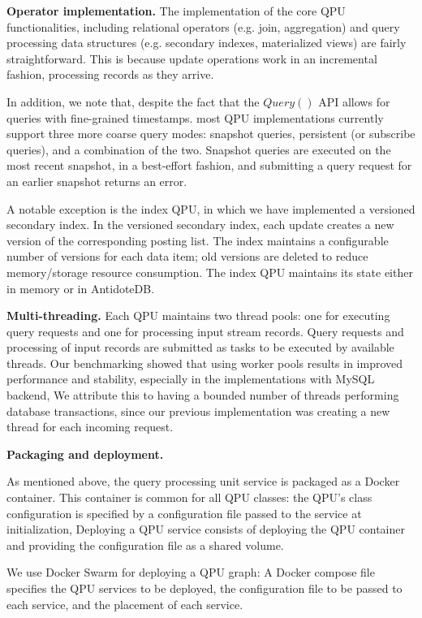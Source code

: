\bigskip
\noindent
\textbf{Operator implementation.}
The implementation of the core QPU functionalities,
including relational operators (e.g. join, aggregation) and query processing data structures (e.g. secondary indexes,
materialized views) are fairly straightforward.
This is because update operations work in an incremental fashion,
processing records as they arrive.


In addition, we note that, despite the fact that the $Query()$ API allows for queries with fine-grained timestamps.
most QPU implementations currently support three more coarse query modes:
snapshot queries, persistent (or subscribe queries), and a combination of the two.
Snapshot queries are executed on the most recent snapshot, in a best-effort fashion,
and submitting a query request for an earlier snapshot returns an error.

A notable exception is the index QPU, in which we have implemented a versioned secondary index.
In the versioned secondary index,
each update creates a new version of the corresponding posting list.
The index maintains a configurable number of versions for each data item;
old versions are deleted to reduce memory/storage resource consumption.
The index QPU maintains its state either in memory or in AntidoteDB.

\bigskip
\noindent
\textbf{Multi-threading.}
Each QPU maintains two thread pools: one for executing query requests and one for processing input stream records.
Query requests and processing of input records are submitted as tasks to be executed by available threads.
Our benchmarking showed that using worker pools results in improved performance and stability,
especially in the implementations with MySQL backend,
We attribute this to having a bounded number of threads performing database transactions,
since our previous implementation was creating a new thread for each incoming request.

\bigskip
\noindent
\textbf{Packaging and deployment.}

As mentioned above, the query processing unit service is packaged as a Docker container.
This container is common for all QPU classes:
the QPU's class configuration is specified by a configuration file passed to the service at initialization,
Deploying a QPU service consists of deploying the QPU container
and providing the configuration file as a shared volume.

We use Docker Swarm for deploying a QPU graph:
A Docker compose file specifies the QPU services to be deployed, the configuration file to be passed to each service,
and the placement of each service.
